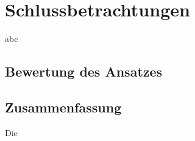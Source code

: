 \chapter{Schlussbetrachtungen}


abc

\section{Bewertung des Ansatzes}

\section{Zusammenfassung}

Die